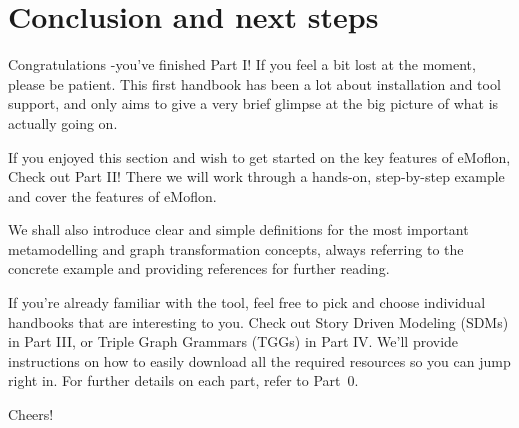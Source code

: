 \newpage \genHeader

\vspace*{2cm}

\section{Conclusion and next steps}
\vspace{0.5cm}

\hypertarget{conclusion}{} 
Congratulations -you've finished Part I! If you feel a bit lost at the moment, please be patient. This first handbook has been a lot
about installation and tool support, and only aims to give a very brief glimpse at the big picture of what is actually going on.

If you enjoyed this section and wish to get started on the key features of eMoflon, Check out Part II! There we will work through a hands-on, step-by-step
example and cover the features of eMoflon.

We shall also introduce clear and simple definitions for the most important metamodelling and graph transformation concepts, always referring to the concrete
example and providing references for further reading.

If you're already familiar with the tool, feel free to pick and choose individual handbooks that are interesting to you. Check out Story Driven Modeling (SDMs)
in Part III, or Triple Graph Grammars (TGGs) in Part IV. We'll provide instructions on how to easily download all the required resources so you can jump
right in. For further details on each part, refer to Part~0.

Cheers!